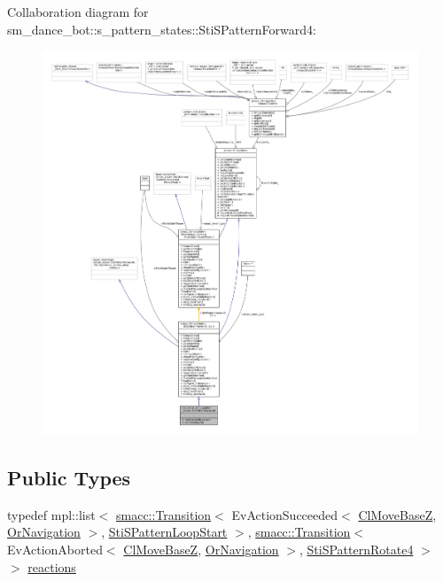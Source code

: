 Collaboration diagram for sm\+\_\+dance\+\_\+bot\+:\+:s\+\_\+pattern\+\_\+states\+:\+:Sti\+S\+Pattern\+Forward4\+:
\nopagebreak
\begin{figure}[H]
\begin{center}
\leavevmode
\includegraphics[width=350pt]{structsm__dance__bot_1_1s__pattern__states_1_1StiSPatternForward4__coll__graph}
\end{center}
\end{figure}
\subsection*{Public Types}
\begin{DoxyCompactItemize}
\item 
typedef mpl\+::list$<$ \hyperlink{classsmacc_1_1Transition}{smacc\+::\+Transition}$<$ Ev\+Action\+Succeeded$<$ \hyperlink{classmove__base__z__client_1_1ClMoveBaseZ}{Cl\+Move\+BaseZ}, \hyperlink{classsm__dance__bot_1_1OrNavigation}{Or\+Navigation} $>$, \hyperlink{structsm__dance__bot_1_1s__pattern__states_1_1StiSPatternLoopStart}{Sti\+S\+Pattern\+Loop\+Start} $>$, \hyperlink{classsmacc_1_1Transition}{smacc\+::\+Transition}$<$ Ev\+Action\+Aborted$<$ \hyperlink{classmove__base__z__client_1_1ClMoveBaseZ}{Cl\+Move\+BaseZ}, \hyperlink{classsm__dance__bot_1_1OrNavigation}{Or\+Navigation} $>$, \hyperlink{structsm__dance__bot_1_1s__pattern__states_1_1StiSPatternRotate4}{Sti\+S\+Pattern\+Rotate4} $>$ $>$ \hyperlink{structsm__dance__bot_1_1s__pattern__states_1_1StiSPatternForward4_ad866ac6fc36bcba87f94f5357ffdd9f8}{reactions}
\end{DoxyCompactItemize}
